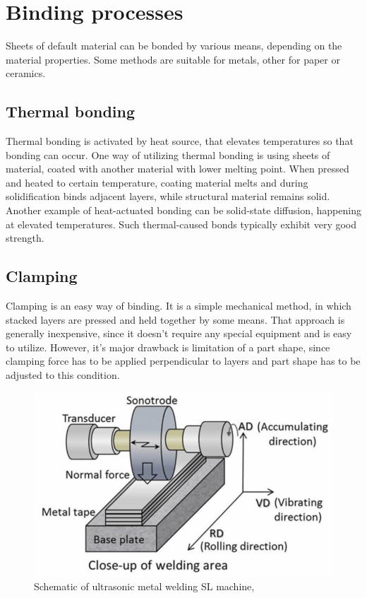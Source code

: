 \documentclass[a4paper, 11pt, reqno]{report}
\begin{document}
\section{Binding processes}
Sheets of default material can be bonded by various means, depending on the material properties. Some methods are suitable for metals, other for paper or ceramics.

\subsection{Thermal bonding}
Thermal bonding is activated by heat source, that elevates temperatures so that bonding can occur. One way of utilizing thermal bonding is using sheets of material, coated with another material with lower melting point. When pressed and heated to certain temperature, coating material melts and during solidification binds adjacent layers, while structural material remains solid. Another example of heat-actuated bonding can be solid-state diffusion, happening at elevated temperatures. Such thermal-caused bonds typically exhibit very good strength.

\subsection{Clamping}
Clamping is an easy way of binding. It is a simple mechanical method, in which stacked layers are pressed and held together by some means. That approach is generally inexpensive, since it doesn't require any special equipment and is easy to utilize. However, it's major drawback is limitation of a part shape, since clamping force has to be applied perpendicular to layers and part shape has to be adjusted to this condition.

\begin{figure}[h!]
	\centering
	\includegraphics[scale=0.8]{sonotrode}
	\caption{Schematic of ultrasonic metal welding SL machine, \cite{sonotrode}}
\end{figure}
\end{document}
